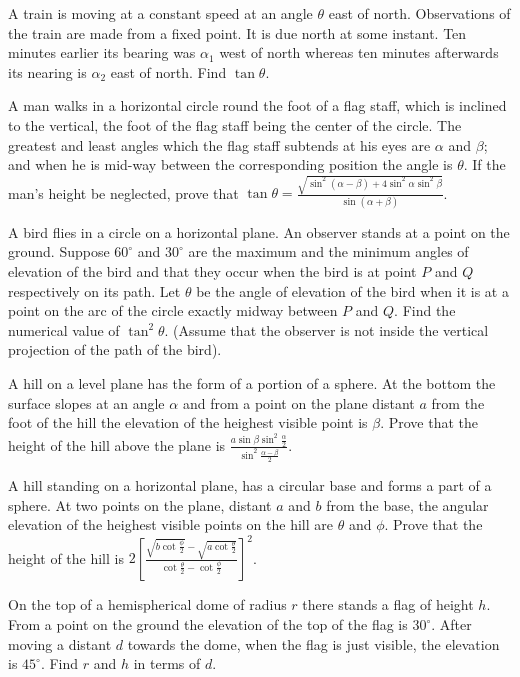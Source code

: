 \item A train is moving at a constant speed at an angle $\theta$ east of north. Observations of the train are made from a
  fixed point. It is due north at some instant. Ten minutes earlier its bearing was $\alpha_1$ west of north whereas
  ten minutes afterwards its nearing is $\alpha_2$ east of north. Find $\tan\theta$.

\item A man walks in a horizontal circle round the foot of a flag staff, which is inclined to the vertical, the foot of the flag
  staff being the center of the circle. The greatest and least angles which the flag staff subtends at his eyes are
  $\alpha$ and $\beta$; and when he is mid-way between the corresponding position the angle is $\theta$. If
  the man's height be neglected, prove that $\tan\theta = \frac{\sqrt{\sin^2(\alpha - \beta) +
      4\sin^2\alpha\sin^2\beta}}{\sin(\alpha + \beta)}$.

\item A bird flies in a circle on a horizontal plane. An observer stands at a point on the ground. Suppose $60^\circ$ and
  $30^\circ$ are the maximum and the minimum angles of elevation of the bird and that they occur when the bird is at point
  $P$ and $Q$ respectively on its path. Let $\theta$ be the angle of  elevation of the bird when it is at a
  point on the arc of the circle exactly midway between $P$ and $Q$. Find the numerical value of
  $\tan^2\theta$. (Assume that the observer is not inside the vertical projection of the path of the bird).

\item A hill on a level plane has the form of a portion of a sphere. At the bottom the surface slopes at an angle $\alpha$ and
  from a point on the plane distant $a$ from the foot of the hill the elevation of the heighest visible point is
  $\beta$. Prove that the height of the hill above the plane is
  $\frac{a\sin\beta\sin^2\frac{\alpha}{2}}{\sin^2\frac{\alpha - \beta}{2}}$.

\item A hill standing on a horizontal plane, has a circular base and forms a part of a sphere. At two points on the plane, distant
  $a$ and $b$ from the base, the angular elevation of the heighest visible points on the hill are $\theta$ and
  $\phi$. Prove that the height of the hill is $2\left[\frac{\sqrt{b\cot\frac{\phi}{2}} -
    \sqrt{a\cot\frac{\theta}{2}}}{\cot\frac{\theta}{2} - \cot\frac{\phi}{2}}\right]^2$.

\item On the top of a hemispherical dome of radius $r$ there stands a flag of height $h$. From a point on the ground the
  elevation of the top of the flag is $30^\circ$. After moving a distant $d$ towards the dome, when the flag is just
  visible, the elevation is $45^\circ$. Find $r$ and $h$ in terms of $d$.


